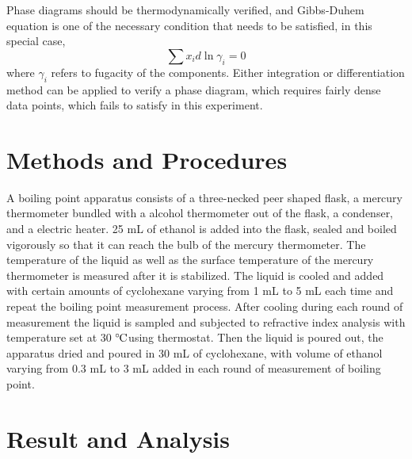 \documentclass[%
 reprint,
 amsmath,amssymb,
 aps,
10.5pt,
]{revtex4-1}
\newcommand{\celsius}{\ensuremath{^\circ\hspace{-0.09em}\mathrm{C}}}
\begin{document}
Phase diagrams should be thermodynamically verified, and Gibbs-Duhem equation is one of the necessary condition that needs to be satisfied, in this special case,
\begin{equation}
\sum x_i d \ln{\gamma_i} = 0
\end{equation}
where $\gamma_i$ refers to fugacity of the components. Either integration or differentiation method can be applied to verify a phase diagram, which requires fairly dense data points, which fails to satisfy in this experiment.



\section{Methods and Procedures}
A boiling point apparatus consists of a three-necked peer shaped flask, a mercury thermometer bundled with a alcohol thermometer out of the flask, a condenser, and a electric heater. 25 mL of ethanol is added into the flask, sealed and boiled vigorously so that it can reach the bulb of the mercury thermometer. The temperature of the liquid as well as the surface temperature of the mercury thermometer is measured after it is stabilized. The liquid is cooled and added with certain amounts of cyclohexane varying from 1 mL to 5 mL each time and repeat the boiling point measurement process. After cooling during each round of measurement the liquid is sampled and subjected to refractive index analysis with temperature set at 30 \celsius using thermostat. Then the liquid is poured out, the apparatus dried and poured in 30 mL of cyclohexane, with volume of ethanol varying from 0.3 mL to 3 mL added in each round of measurement of boiling point. 




\section{Result and Analysis}
\end{document}
